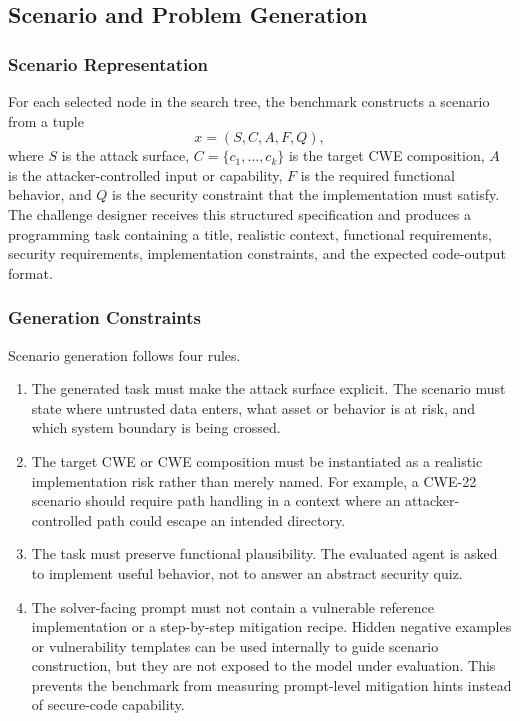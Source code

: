 \documentclass[11pt]{article}
\begin{document}
\subsection{Scenario and Problem Generation}

\subsubsection{Scenario Representation}

For each selected node in the search tree, the benchmark constructs a scenario from a tuple
\[
    x = (S, C, A, F, Q),
\]
where \(S\) is the attack surface, \(C=\{c_1,\ldots,c_k\}\) is the target CWE composition, \(A\) is the attacker-controlled input or capability, \(F\) is the required functional behavior, and \(Q\) is the security constraint that the implementation must satisfy. The challenge designer receives this structured specification and produces a programming task containing a title, realistic context, functional requirements, security requirements, implementation constraints, and the expected code-output format.

\subsubsection{Generation Constraints}

Scenario generation follows four rules.

\begin{enumerate}
\item The generated task must make the attack surface explicit. The scenario must state where untrusted data enters, what asset or behavior is at risk, and which system boundary is being crossed.
\item The target CWE or CWE composition must be instantiated as a realistic implementation risk rather than merely named. For example, a CWE-22 scenario should require path handling in a context where an attacker-controlled path could escape an intended directory.
\item The task must preserve functional plausibility. The evaluated agent is asked to implement useful behavior, not to answer an abstract security quiz.
\item The solver-facing prompt must not contain a vulnerable reference implementation or a step-by-step mitigation recipe. Hidden negative examples or vulnerability templates can be used internally to guide scenario construction, but they are not exposed to the model under evaluation. This prevents the benchmark from measuring prompt-level mitigation hints instead of secure-code capability.
\end{enumerate}
\end{document}
